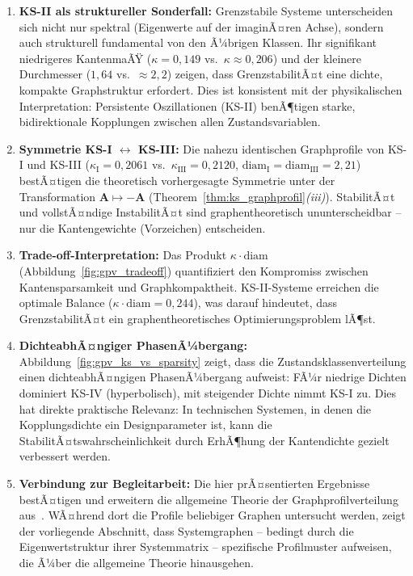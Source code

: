 ﻿\documentclass[12pt, a4paper, titlepage]{report}
\theoremstyle{definition}
\theoremstyle{remark}
\newcommand{\vA}{\bm{A}}
\begin{document}
\begin{enumerate}[label=(\arabic*)]
  \item \textbf{KS-II als struktureller Sonderfall:} Grenzstabile Systeme unterscheiden
    sich nicht nur spektral (Eigenwerte auf der imaginÃ¤ren Achse), sondern auch strukturell
    fundamental von den Ã¼brigen Klassen. Ihr signifikant niedrigeres KantenmaÃŸ
    ($\kappa = 0{,}149$ vs.\ $\kappa \approx 0{,}206$) und der kleinere Durchmesser
    ($1{,}64$ vs.\ $\approx 2{,}2$) zeigen, dass GrenzstabilitÃ¤t eine dichte, kompakte
    Graphstruktur erfordert. Dies ist konsistent mit der physikalischen Interpretation:
    Persistente Oszillationen (KS-II) benÃ¶tigen starke, bidirektionale Kopplungen
    zwischen allen Zustandsvariablen.

  \item \textbf{Symmetrie KS-I $\leftrightarrow$ KS-III:} Die nahezu identischen
    Graphprofile von KS-I und KS-III ($\kappa_{\mathrm{I}} = 0{,}2061$ vs.\
    $\kappa_{\mathrm{III}} = 0{,}2120$, $\mathrm{diam}_{\mathrm{I}} =
    \mathrm{diam}_{\mathrm{III}} = 2{,}21$) bestÃ¤tigen die theoretisch vorhergesagte
    Symmetrie unter der Transformation $\vA \mapsto -\vA$
    (Theorem~\ref{thm:ks_graphprofil}\textit{(iii)}). StabilitÃ¤t und vollstÃ¤ndige
    InstabilitÃ¤t sind graphentheoretisch ununterscheidbar -- nur die Kantengewichte
    (Vorzeichen) entscheiden.

  \item \textbf{Trade-off-Interpretation:} Das Produkt $\kappa \cdot \mathrm{diam}$
    (Abbildung~\ref{fig:gpv_tradeoff}) quantifiziert den Kompromiss zwischen
    Kantensparsamkeit und Graphkompaktheit. KS-II-Systeme erreichen die optimale
    Balance ($\kappa \cdot \mathrm{diam} = 0{,}244$), was darauf hindeutet, dass
    GrenzstabilitÃ¤t ein graphentheoretisches Optimierungsproblem lÃ¶st.

  \item \textbf{DichteabhÃ¤ngiger PhasenÃ¼bergang:} Abbildung~\ref{fig:gpv_ks_vs_sparsity}
    zeigt, dass die Zustandsklassenverteilung einen dichteabhÃ¤ngigen PhasenÃ¼bergang
    aufweist: FÃ¼r niedrige Dichten dominiert KS-IV (hyperbolisch), mit steigender
    Dichte nimmt KS-I zu. Dies hat direkte praktische Relevanz: In technischen
    Systemen, in denen die Kopplungsdichte ein Designparameter ist, kann die
    StabilitÃ¤tswahrscheinlichkeit durch ErhÃ¶hung der Kantendichte gezielt verbessert
    werden.

  \item \textbf{Verbindung zur Begleitarbeit:} Die hier prÃ¤sentierten Ergebnisse
    bestÃ¤tigen und erweitern die allgemeine Theorie der Graphprofilverteilung
    aus~\citep{epp2026graphs}. WÃ¤hrend dort die Profile beliebiger Graphen untersucht
    werden, zeigt der vorliegende Abschnitt, dass Systemgraphen -- bedingt durch die
    Eigenwertstruktur ihrer Systemmatrix -- spezifische Profilmuster aufweisen, die Ã¼ber
    die allgemeine Theorie hinausgehen.
\end{enumerate}
\end{document}
